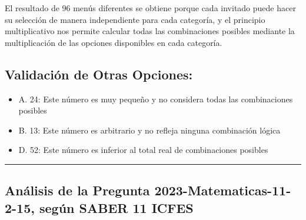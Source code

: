 \documentclass[
]{article}
\providecommand{\tightlist}{%
  \setlength{\itemsep}{0pt}\setlength{\parskip}{0pt}}
\begin{document}
El resultado de 96 menús diferentes se obtiene porque cada invitado
puede hacer su selección de manera independiente para cada categoría, y
el principio multiplicativo nos permite calcular todas las combinaciones
posibles mediante la multiplicación de las opciones disponibles en cada
categoría.

\subsection{Validación de Otras
Opciones:}\label{validaciuxf3n-de-otras-opciones}

\begin{itemize}
\tightlist
\item
  A. 24: Este número es muy pequeño y no considera todas las
  combinaciones posibles
\item
  B. 13: Este número es arbitrario y no refleja ninguna combinación
  lógica
\item
  D. 52: Este número es inferior al total real de combinaciones posibles
\end{itemize}

\begin{center}\rule{0.5\linewidth}{0.5pt}\end{center}

\subsection{Análisis de la Pregunta 2023-Matematicas-11-2-15, según
SABER 11
ICFES}\label{anuxe1lisis-de-la-pregunta-2023-matematicas-11-2-15-seguxfan-saber-11-icfes}
\end{document}

